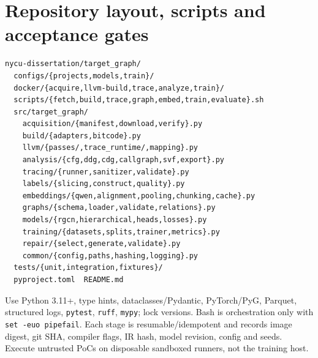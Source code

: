 \documentclass[10pt,a4paper]{article}
\begin{document}
\section{Repository layout, scripts and acceptance gates}
\begin{lstlisting}
nycu-dissertation/target_graph/
  configs/{projects,models,train}/
  docker/{acquire,llvm-build,trace,analyze,train}/
  scripts/{fetch,build,trace,graph,embed,train,evaluate}.sh
  src/target_graph/
    acquisition/{manifest,download,verify}.py
    build/{adapters,bitcode}.py
    llvm/{passes/,trace_runtime/,mapping}.py
    analysis/{cfg,ddg,cdg,callgraph,svf,export}.py
    tracing/{runner,sanitizer,validate}.py
    labels/{slicing,construct,quality}.py
    embeddings/{qwen,alignment,pooling,chunking,cache}.py
    graphs/{schema,loader,validate,relations}.py
    models/{rgcn,hierarchical,heads,losses}.py
    training/{datasets,splits,trainer,metrics}.py
    repair/{select,generate,validate}.py
    common/{config,paths,hashing,logging}.py
  tests/{unit,integration,fixtures}/
  pyproject.toml  README.md
\end{lstlisting}
Use Python 3.11+, type hints, dataclasses/Pydantic, PyTorch/PyG, Parquet, structured logs, \texttt{pytest}, \texttt{ruff}, \texttt{mypy}; lock versions. Bash is orchestration only with \texttt{set -euo pipefail}. Each stage is resumable/idempotent and records image digest, git SHA, compiler flags, IR hash, model revision, config and seeds. Execute untrusted PoCs on disposable sandboxed runners, not the training host.
\end{document}
